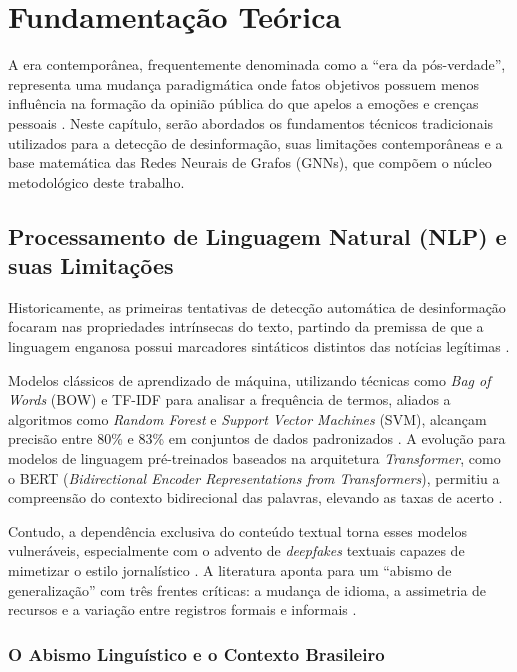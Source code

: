 \chapter{Fundamentação Teórica}

A era contemporânea, frequentemente denominada como a ``era da pós-verdade'', representa uma mudança paradigmática onde fatos objetivos possuem menos influência na formação da opinião pública do que apelos a emoções e crenças pessoais \cite{umich_posttruth}. Neste capítulo, serão abordados os fundamentos técnicos tradicionais utilizados para a detecção de desinformação, suas limitações contemporâneas e a base matemática das Redes Neurais de Grafos (GNNs), que compõem o núcleo metodológico deste trabalho.

\section{Processamento de Linguagem Natural (NLP) e suas Limitações}

Historicamente, as primeiras tentativas de detecção automática de desinformação focaram nas propriedades intrínsecas do texto, partindo da premissa de que a linguagem enganosa possui marcadores sintáticos distintos das notícias legítimas \cite{pmc_slrfakenews, pmc_gnnsurveyfakenews}.

Modelos clássicos de aprendizado de máquina, utilizando técnicas como \textit{Bag of Words} (BOW) e TF-IDF para analisar a frequência de termos, aliados a algoritmos como \textit{Random Forest} e \textit{Support Vector Machines} (SVM), alcançam precisão entre 80\% e 83\% em conjuntos de dados padronizados \cite{scitepress_nlpfakenews}. A evolução para modelos de linguagem pré-treinados baseados na arquitetura \textit{Transformer}, como o BERT (\textit{Bidirectional Encoder Representations from Transformers}), permitiu a compreensão do contexto bidirecional das palavras, elevando as taxas de acerto \cite{mdpi_cnn_llm_nlp, pmc_slrfakenews}.

Contudo, a dependência exclusiva do conteúdo textual torna esses modelos vulneráveis, especialmente com o advento de \textit{deepfakes} textuais capazes de mimetizar o estilo jornalístico \cite{pmc_multilangs_covid, mdpi_cnn_llm_nlp}. A literatura aponta para um ``abismo de generalização'' com três frentes críticas: a mudança de idioma, a assimetria de recursos e a variação entre registros formais e informais \cite{pmc_multimodalfakenews, stanford_nlpmisinformation}.

\subsection{O Abismo Linguístico e o Contexto Brasileiro}


